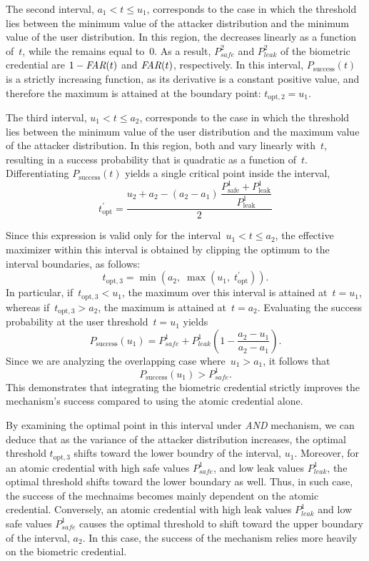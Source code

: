 \documentclass[conference,compsoc]{IEEEtran}
\begin{document}
The second interval, $a_1 < t \le u_1$, corresponds to the case in which the threshold lies between the minimum value of the attacker distribution and the minimum value of the user distribution. In this region, the \FAR decreases linearly as a function of~$t$, while the \FRR remains equal to~0. As a result, $P^2_{safe}$ and $P^2_{leak}$ of the biometric credential are $1-\textit{FAR}(t)$ and $\textit{FAR}(t)$, respectively. In this interval, $P_{\text{success}}(t)$ is a strictly increasing function, as its derivative is a constant positive value, and therefore the maximum is attained at the boundary point: $t_{\text{opt},2} = u_1$.


The third interval, $u_1 < t \le a_2$, corresponds to the case in which the threshold lies between the minimum value of the user distribution and the maximum value of the attacker distribution. In this region, both \FAR and \FRR vary linearly with~$t$, resulting in a success probability that is quadratic as a function of~$t$. Differentiating $P_{\text{success}}(t)$ yields a single critical point inside the interval,
\[
t_{\text{opt}}^\prime
=
\frac{
u_2 + a_2
- (a_2 - a_1)\,\dfrac{P^1_{\text{safe}} + P^1_{\text{leak}}}{P^1_{\text{leak}}}
}{2}
\]

Since this expression is valid only for the interval~$u_1 < t \le a_2$, the effective maximizer within this interval is obtained by clipping the optimum to the interval boundaries, as follows:
\[
t_{\text{opt},3}
=
\min\!\left(
a_2,\;
\max\!\left(u_1,\; t_{\text{opt}}^\prime\right)
\right).
\]
In particular, if~$t_{\text{opt},3} < u_1$, the maximum over this interval is  attained at~$t=u_1$, whereas if~$t_{\text{opt},3} > a_2$, the maximum is attained at~$t=a_2$. Evaluating the success probability at the user threshold~$t=u_1$ yields
\[
P_{\text{success}}(u_1)
=
P^1_{safe} + P^1_{leak}(1
- \frac{a_2 - u_1}{a_2 - a_1}).
\]
Since we are analyzing the overlapping case where~$u_1 > a_1$, it follows that
\[
P_{\text{success}}(u_1) > P^1_{safe}.
\]
This demonstrates that integrating the biometric credential strictly improves the mechanism’s success compared to using the atomic credential alone.

By examining the optimal point in this interval under \emph{AND} mechanism, we can deduce that as the variance of the attacker distribution increases, the optimal threshold $t_{\text{opt},3}$ shifts toward the lower boundry of the interval, $u_1$. Moreover, for an atomic credential with high safe values $P^1_{safe}$, and low leak values $P^1_{leak}$, the optimal threshold shifts toward the lower boundary as well. Thus, in such case, the success of the mechnaims becomes mainly dependent on the atomic credential. Conversely, an atomic credential with high leak values $P^1_{leak}$ and low safe values $P^1_{safe}$ causes the optimal threshold to shift toward the upper boundary of the interval, $a_2$. In this case, the success of the mechanism relies more heavily on the biometric credential.
\end{document}
